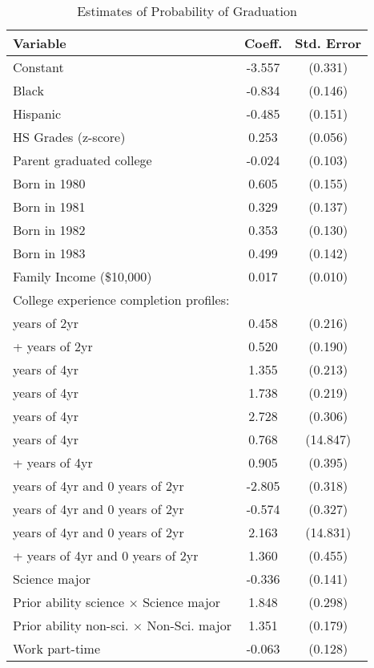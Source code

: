 \begin{table}[ht]
\caption{Estimates of Probability of Graduation}
\label{tab:GprobEstimates}
\centering
\begin{threeparttable}
\renewcommand{\arraystretch}{0.7}
\begin{tabular}{lcc}
\toprule
Variable  & Coeff.  & Std. Error \\ 
\midrule
Constant & -3.557 & (0.331) \\ 
Black & -0.834 & (0.146) \\ 
Hispanic & -0.485 & (0.151) \\ 
HS Grades (z-score) & 0.253 & (0.056) \\ 
Parent graduated college & -0.024 & (0.103) \\ 
Born in 1980 & 0.605 & (0.155) \\ 
Born in 1981 & 0.329 & (0.137) \\ 
Born in 1982 & 0.353 & (0.130) \\ 
Born in 1983 & 0.499 & (0.142) \\ 
Family Income (\$10,000) & 0.017 & (0.010) \\ 
College experience completion profiles: & & \\ 
\qquad 0  years of 2yr & 0.458 & (0.216) \\ 
\qquad 2+ years of 2yr & 0.520 & (0.190) \\ 
\qquad 2  years of 4yr & 1.355 & (0.213) \\ 
\qquad 3  years of 4yr & 1.738 & (0.219) \\ 
\qquad 4  years of 4yr & 2.728 & (0.306) \\ 
\qquad 5  years of 4yr & 0.768 & (14.847) \\ 
\qquad 6+ years of 4yr & 0.905 & (0.395) \\ 
\qquad 2  years of 4yr and 0 years of 2yr & -2.805 & (0.318) \\ 
\qquad 4  years of 4yr and 0 years of 2yr & -0.574 & (0.327) \\ 
\qquad 5  years of 4yr and 0 years of 2yr & 2.163 & (14.831) \\ 
\qquad 6+ years of 4yr and 0 years of 2yr & 1.360 & (0.455) \\ 
Science major & -0.336 & (0.141) \\ 
Prior ability science $\times$ Science major & 1.848 & (0.298) \\ 
Prior ability non-sci. $\times$ Non-Sci. major & 1.351 & (0.179) \\ 
Work part-time & -0.063 & (0.128) \\ 

\end{tabular}
\end{threeparttable}
\end{table}
